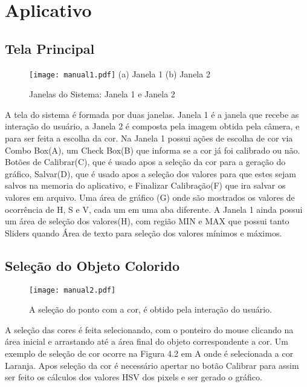 
\chapter{Aplicativo} \label{Cap:Aplicativo}
\section{Tela Principal}
\begin{figure}[!h]
	\centering
	\texttt{[image: manual1.pdf]}
	(a) Janela 1 \hspace{5cm} (b) Janela 2
	\caption{Janelas do Sistema: Janela 1 e Janela 2 }
	\label{TelanInicial}
\end{figure}
A tela do sistema é formada por duas janelas. Janela 1 é a janela que recebe as interação do usuário, a Janela 2 é composta pela imagem obtida pela câmera, e para ser feita a escolha da cor.
Na Janela 1 possui ações de escolha de cor via Combo Box(A), um Check Box(B) que informa se a cor já foi calibrado ou não. Botões de Calibrar(C), que é usado apos a seleção da cor para a geração do gráfico, Salvar(D), que é usado apos a seleção dos valores para que estes sejam salvos na memoria do aplicativo, e Finalizar Calibração(F) que ira salvar os valores em arquivo. Uma área de gráfico (G) onde são mostrados os valores de ocorrência de H, S e V, cada um em uma aba diferente. A Janela 1 ainda possui um área de seleção dos valores(H), com região MIN e MAX que possui tanto Sliders quando Área de texto para seleção dos valores mínimos e máximos.
 \newpage

\section{Seleção do Objeto Colorido}
\begin{figure}[!h]
	\centering
	\texttt{[image: manual2.pdf]}
	\caption{A seleção do ponto com a cor, é obtido pela interação do usuário.}
	\label{SelecaoCor}
\end{figure}
A seleção das cores é feita selecionando, com o ponteiro do mouse clicando na área inicial e arrastando até a área final do objeto correspondente a cor. Um exemplo de seleção de cor ocorre na Figura 4.2 em A onde é selecionada a cor Laranja. Apos seleção da cor é necessário apertar no botão Calibrar para assim ser feito os cálculos dos valores HSV dos pixels e ser gerado o gráfico.

